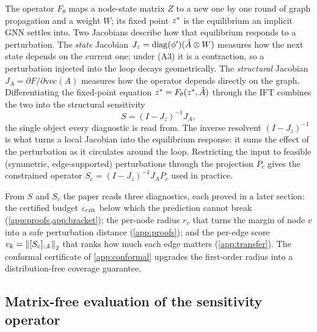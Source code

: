 The operator $F_\theta$ maps a node-state matrix $Z$ to a new one by one round of graph propagation and a
weight $W$; its fixed point $z^{*}$ is the equilibrium an implicit GNN settles into. Two Jacobians
describe how that equilibrium responds to a perturbation. The \emph{state} Jacobian
$J_z=\operatorname{diag}(\phi')(\hat{A}\otimes W)$ measures how the next state depends on the current one; under (A3) it
is a contraction, so a perturbation injected into the loop decays geometrically. The \emph{structural}
Jacobian $J_A=\partial F/\partial\mathrm{vec}(A)$ measures how the operator depends directly on the
graph. Differentiating the fixed-point equation $z^{*}=F_\theta(z^{*},\hat{A})$ through the IFT combines
the two into the structural sensitivity
\begin{equation}
S=(I-J_z)^{-1}J_A,
\label{eq:S-def}
\end{equation}
the single object every diagnostic is read from. The inverse resolvent $(I-J_z)^{-1}$ is what turns a
local Jacobian into the equilibrium response: it sums the effect of the perturbation as it circulates
around the loop. Restricting the input to feasible (symmetric, edge-supported) perturbations through the
projection $P_c$ gives the constrained operator $S_c=(I-J_z)^{-1}J_A P_c$ used in practice.

From $S$ and $S_c$ the paper reads three diagnostics, each proved in a later section: the certified
budget $\varepsilon_{\mathrm{crit}}$ below which the prediction cannot break (\cref{app:proofs,app:bracket}); the per-node
radius $r_v$ that turns the margin of node $v$ into a safe perturbation distance (\cref{app:proofs}); and
the per-edge score $v_k=\left\|[S_c]_{:,k}\right\|_2$ that ranks how much each edge matters
(\cref{app:transfer}). The conformal certificate of \cref{app:conformal} upgrades the first-order radius
into a distribution-free coverage guarantee.

\subsection{Matrix-free evaluation of the sensitivity operator}
\label{app:matrixfree}

